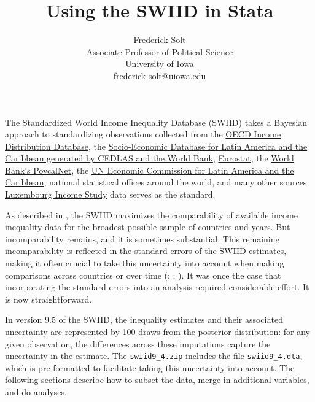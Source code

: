 \documentclass[11pt]{article}
\begin{document}
\title{Using the SWIID in Stata}
\author{
Frederick Solt\\
  Associate Professor of Political Science\\
  University of Iowa\\
  \href{mailto:frederick-solt@uiowa.edu}{frederick-solt@uiowa.edu}}
\date{}
\maketitle 

The Standardized World Income Inequality Database (SWIID) takes a Bayesian approach to standardizing observations collected from the \href{http://www.oecd.org/social/inequality.htm}{OECD Income Distribution Database}, the \href{http://sedlac.econo.unlp.edu.ar/eng/}{Socio-Economic Database for Latin America and the Caribbean generated by CEDLAS and the World Bank}, \href{http://epp.eurostat.ec.europa.eu}{Eurostat}, the \href{http://iresearch.worldbank.org/PovcalNet/index.htm}{World Bank's PovcalNet}, the \href{http://interwp.cepal.org/sisgen/ConsultaIntegrada.asp?idIndicador=250\&idioma=e}{UN Economic Commission for Latin America and the Caribbean}, national statistical offices around the world, and many other sources.  \href{http://www.lisdatacenter.org}{Luxembourg Income Study} data serves as the standard.  

As described in \citet{Solt2020}, the SWIID maximizes the comparability of available income inequality data for the broadest possible sample of countries and years.  But incomparability remains, and it is sometimes substantial.  This remaining incomparability is reflected in the standard errors of the SWIID estimates, making it often crucial to take this uncertainty into account when making comparisons across countries or over time (\citealt[238]{Solt2009}; \citealt[14]{Solt2016_nv}; \citealt{Solt2020}).  It was once the case that incorporating the standard errors into an analysis required considerable effort.  It is now straightforward.

In version 9.5 of the SWIID, the inequality estimates and their associated uncertainty are represented by 100 draws from the posterior
distribution: for any given observation, the differences across these imputations capture the uncertainty in the estimate.  The \verb+swiid9_4.zip+ includes the file \verb+swiid9_4.dta+, which is pre-formatted to facilitate taking this uncertainty into account.  The following sections describe how to subset the data, merge in additional variables, and do analyses.
\end{document}
